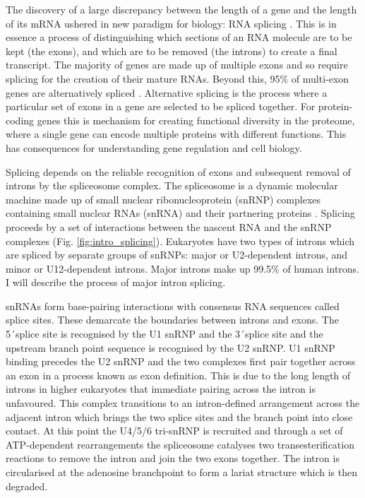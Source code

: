 The discovery of a large discrepancy between the length of a gene and the length of its mRNA ushered in new paradigm for biology: RNA splicing \citep{Berget1977,Chow1977}.
This is in essence a process of distinguishing which sections of an RNA molecule are to be kept (the exons), and which are to be removed (the introns) to create a final transcript.
The majority of genes are made up of multiple exons and so require splicing for the creation of their mature RNAs. 
Beyond this, 95\% of multi-exon genes are alternatively spliced \citep{Pan2008,Wang2008}. 
Alternative splicing is the process where a particular set of exons in a gene are selected to be spliced together.
For protein-coding genes this is mechanism for creating functional diversity in the proteome, where a single gene can encode multiple proteins with different functions.
This has consequences for understanding gene regulation and cell biology.

Splicing depends on the reliable recognition of exons and subsequent removal of introns by the spliceosome complex. 
The spliceosome is a dynamic molecular machine made up of small nuclear ribonucleoprotein (snRNP) complexes containing small nuclear RNAs (snRNA) and their partnering proteins \citep{Matera2014}. 
Splicing proceeds by a set of interactions between the nascent RNA and the snRNP complexes (Fig. \ref{fig:intro_splicing}).
Eukaryotes have two types of introns which are spliced by separate groups of snRNPs: major or U2-dependent introns, and minor or U12-dependent introns. 
Major introns make up 99.5\% of human introns. I will describe the process of major intron splicing.

snRNAs form base-pairing interactions with consensus RNA sequences called splice sites. 
These demarcate the boundaries between introns and exons. 
The 5\'\ splice site is recognised by the U1 snRNP and the 3\'\ splice site and the upstream branch point sequence is recognised by the U2 snRNP.
U1 snRNP binding precedes the U2 snRNP and the two complexes first pair together across an exon in a process known as exon definition. 
This is due to the long length of introns in higher eukaryotes that immediate pairing across the intron is unfavoured.
This complex transitions to an intron-defined arrangement across the adjacent intron which brings the two splice sites and the branch point into close contact.
At this point the U4/5/6 tri-snRNP is recruited and through a set of ATP-dependent rearrangements the spliceosome catalyses two transesterification reactions to remove the intron and join the two exons together.
The intron is circularised at the adenosine branchpoint to form a lariat structure which is then degraded.

